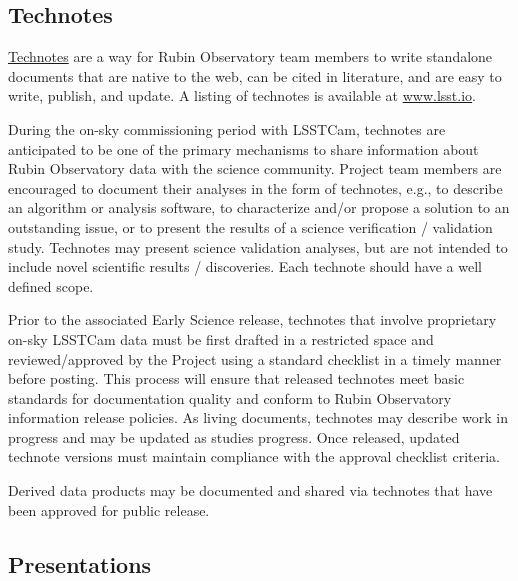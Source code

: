 \documentclass[SE,authoryear,toc,lsstdraft]{lsstdoc}
\begin{document}

\subsection{Technotes}
\label{technotes}

\href{https://developer.lsst.io/project-docs/technotes.html}{Technotes} are a way for Rubin Observatory team members to write standalone documents that are native to the web, can be cited in literature, and are easy to write, publish, and update.
A listing of technotes is available at \url{www.lsst.io}.

During the on-sky commissioning period with LSSTCam, technotes are anticipated to be one of the primary mechanisms to share information about Rubin Observatory data with the science community.
Project team members are encouraged to document their analyses in the form of technotes, e.g., to describe an algorithm or analysis software, to characterize and/or propose a solution to an outstanding issue, or to present the results of a science verification / validation study.
Technotes may present science validation analyses, but are not intended to include novel scientific results / discoveries.
Each technote should have a well defined scope.

Prior to the associated Early Science release, technotes that involve proprietary on-sky LSSTCam data must be first drafted in a restricted space and reviewed/approved by the Project using a standard checklist in a timely manner before posting.
This process will ensure that released technotes meet basic standards for documentation quality and conform to Rubin Observatory information release policies.
As living documents, technotes may describe work in progress and may be updated as studies progress.
Once released, updated technote versions must maintain compliance with the approval checklist criteria.

Derived data products may be documented and shared via technotes that have been approved for public release.


\subsection{Presentations}
\end{document}
